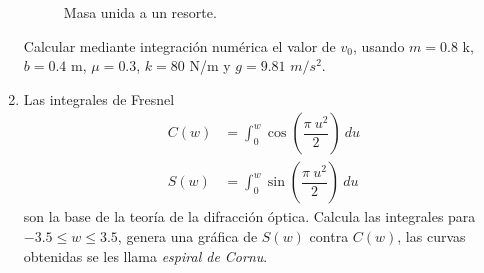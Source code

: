 \documentclass[11pt]{article}
\begin{document}
\begin{enumerate}
\begin{figure}[H]
	\caption{Masa unida a un resorte.}
\end{figure}
Calcular mediante integración numérica el valor de $v_{0}$, usando $m=0.8$ k, $b=0.4$ m, $\mu=0.3$, $k=80$ N/m y $g=9.81$ $m/s^{2}$.
\item Las integrales de Fresnel
\begin{align*}
C(w) &= \int_{0}^{w} \cos \left( \dfrac{\pi \: u^{2}}{2} \right) \: du \\[1em]
S(w) &= \int_{0}^{w} \sin \left( \dfrac{\pi \: u^{2}}{2} \right) \: du
\end{align*}
son la base de la teoría de la difracción óptica. Calcula las integrales para $-3.5 \leq w \leq 3.5$, genera una gráfica de $S(w)$ contra $C(w)$, las curvas obtenidas se les llama \textit{espiral de Cornu}.
\end{enumerate}
\end{document}
